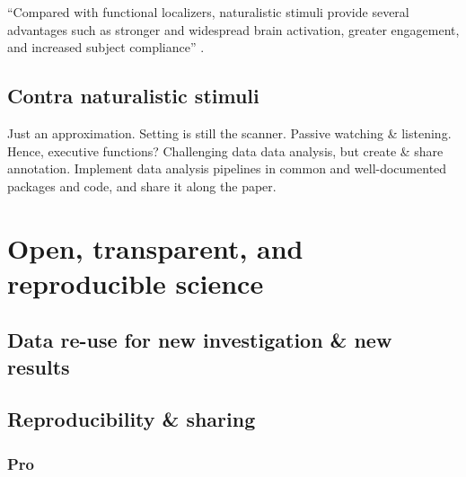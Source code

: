 

%
``Compared with functional localizers, naturalistic stimuli provide several
advantages such as stronger and widespread brain activation, greater engagement,
and increased subject compliance'' \citep{jiahui2020predicting}.

\subsection{Contra naturalistic stimuli}

%
Just an approximation.
%
Setting is still the scanner.
%
Passive watching \& listening. Hence, executive functions?
%
Challenging data data analysis, but create \& share annotation.
%
Implement data analysis pipelines in common and well-documented packages and
code, and share it along the paper.


\section{Open, transparent, and reproducible science}


\subsection{Data re-use for new investigation \& new results}






\subsection{Reproducibility \& sharing}



\subsubsection{Pro}

